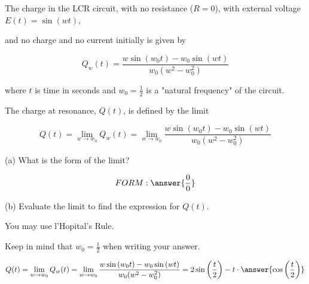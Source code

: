 \documentclass{ximera}
\author{Nela Lakos}
\begin{document}
\begin{exercise}
The charge in the LCR circuit, with no resistance ($R=0$), with external voltage $E(t)=\sin{(w t)}$, 

and no charge and no current initially is given by

\[
Q_{w}(t)=\frac{w\sin{(w_{0} t)-w_{0}\sin{(w t)}}}{w_{0}(w^2-w_{0}^2)}
\]

where $t$ is time in seconds and $w_{0}=\frac{1}{2}$ is a "natural frequency" of the circuit.

The charge at resonance, $Q(t)$, is defined by the limit

\[
Q(t)=\lim_{w\to w_{0}} Q_{w}(t)=\lim_{w\to w_{0}} \frac{w\sin{(w_{0} t)-w_{0}\sin{(w t)}}}{w_{0}(w^2-w_{0}^2)}
\]

(a) What is the form of the limit?

\[
FORM:\answer{\frac{0}{0}}
\]

(b)  Evaluate the limit to find the expression for $Q(t)$. 

You may use l’Hopital’s Rule.


Keep in mind that $w_{0}=\frac{1}{2}$ when writing your answer. 

\[
Q(t)=\lim_{w\to w_{0}} Q_{w}(t)=\lim_{w\to w_{0}} \frac{w\sin{(w_{0} t)-w_{0}\sin{(w t)}}}{w_{0}(w^2-w_{0}^2)}=2\sin{\left(\frac{ t}{2}\right)-t\cdot\answer{\cos{\left(\frac{t}{2}\right)}}}
\]



\end{exercise}
\end{document}
